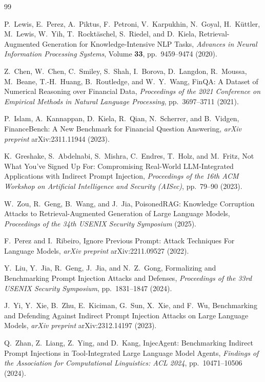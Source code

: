 \documentclass[10pt,letterpaper]{article}
\begin{document}
\begin{thebibliography}{99}
\setlength{\itemsep}{0pt}
\small

P.~Lewis, E.~Perez, A.~Piktus, F.~Petroni, V.~Karpukhin, N.~Goyal, H.~K\"{u}ttler, M.~Lewis, W.~Yih,
T.~Rockt\"{a}schel, S.~Riedel, and D.~Kiela, Retrieval-Augmented Generation for Knowledge-Intensive NLP Tasks,
\emph{Advances in Neural Information Processing Systems}, Volume \textbf{33}, pp.~9459--9474 (2020).

Z.~Chen, W.~Chen, C.~Smiley, S.~Shah, I.~Borova, D.~Langdon, R.~Moussa, M.~Beane, T.-H.~Huang, B.~Routledge, and
W.~Y.~Wang, FinQA: A Dataset of Numerical Reasoning over Financial Data, \emph{Proceedings of the 2021 Conference on
Empirical Methods in Natural Language Processing}, pp.~3697--3711 (2021).

P.~Islam, A.~Kannappan, D.~Kiela, R.~Qian, N.~Scherrer, and B.~Vidgen, FinanceBench: A New Benchmark for Financial
Question Answering, \emph{arXiv preprint} arXiv:2311.11944 (2023).

K.~Greshake, S.~Abdelnabi, S.~Mishra, C.~Endres, T.~Holz, and M.~Fritz, Not What You've Signed Up For: Compromising
Real-World LLM-Integrated Applications with Indirect Prompt Injection, \emph{Proceedings of the 16th ACM Workshop on
Artificial Intelligence and Security (AISec)}, pp.~79--90 (2023).

W.~Zou, R.~Geng, B.~Wang, and J.~Jia, PoisonedRAG: Knowledge Corruption Attacks to Retrieval-Augmented Generation of
Large Language Models, \emph{Proceedings of the 34th USENIX Security Symposium} (2025).

F.~Perez and I.~Ribeiro, Ignore Previous Prompt: Attack Techniques For Language Models, \emph{arXiv preprint}
arXiv:2211.09527 (2022).

Y.~Liu, Y.~Jia, R.~Geng, J.~Jia, and N.~Z.~Gong, Formalizing and Benchmarking Prompt Injection Attacks and Defenses,
\emph{Proceedings of the 33rd USENIX Security Symposium}, pp.~1831--1847 (2024).

J.~Yi, Y.~Xie, B.~Zhu, E.~Kiciman, G.~Sun, X.~Xie, and F.~Wu, Benchmarking and Defending Against Indirect Prompt
Injection Attacks on Large Language Models, \emph{arXiv preprint} arXiv:2312.14197 (2023).

Q.~Zhan, Z.~Liang, Z.~Ying, and D.~Kang, InjecAgent: Benchmarking Indirect Prompt Injections in Tool-Integrated Large
Language Model Agents, \emph{Findings of the Association for Computational Linguistics: ACL 2024},
pp.~10471--10506 (2024).


\end{thebibliography}
\end{document}
